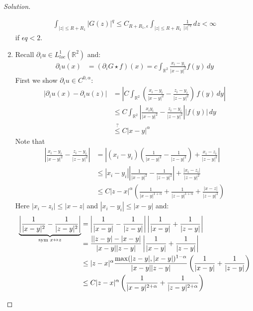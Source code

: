 \documentclass{report}
\theoremstyle{tommy}
\begin{document}
\begin{proof}[Solution]
\begin{enumerate}
      \begin{align*}
        \int_{|z| \le R + R_1} |G(z)|^q \le C_{R + R_1, \epsilon} \int_{|z| \le R + R_1} \frac{1}{|z|^{\epsilon q}} \, dz < \infty
      \end{align*}
      if \(\epsilon q < 2\).
      \item Recall \(\partial_i u \in L_{loc}^1(\mathbb{R}^2)\) and:
      \begin{align*}
        \partial_i u(x) &= (\partial_i G \star f)(x) 
        = c \int_{\mathbb{R}^2} \frac{x_i - y_i}{|x-y|^2} f(y) \, dy
      \end{align*}
      First we show \(\partial_i u \in C^{0, \alpha}\): 
      \begin{align*}
        |\partial_i u(x) - \partial_i u(z)|
        &= \left| C \int_{\mathbb{R}^2} \left(\frac{x_i - y_i}{|x-y|^2} - \frac{z_i - y_i}{|z-y|^2}\right) \, f(y) \, dy \right| \\
        &\le C \int_{\mathbb{R}^2} \left| \frac{x_i y_i}{|x-y|^2} - \frac{z_i - y_i}{|z-y|^2} \right| |f(y)| \, dy \\
        &\overset{?}{\le} C |x-y|^\alpha
      \end{align*}
      Note that 
      \begin{align*}
        \left| \frac{x_i - y_i}{|x-y|^2} - \frac{z_i - y_i}{|z-y|^2} \right| 
        &= \left| (x_i  - y_i) \left(\frac{1}{|x-y|^2} - \frac{1}{|z-y|^2}\right) + \frac{x_i - z_i}{|z-y|^2} \right| \\
        &\le |x_i - y_i| \left| \frac{1}{|x-y|^2} - \frac{1}{|z-y|^2} \right| + \frac{|x_i - z_i|}{|z-y|^2} \\
        &\le C|z-x|^\alpha \left(\frac{1}{|x-y|^{1 + \alpha}} + \frac{1}{|z-y|^{1 + \alpha}} + \frac{|x-z|}{|z-y|^{2}}\right)
      \end{align*}
      Here \(|x_i - z_i| \le |x-z|\) and \(|x_i - y_i| \le |x-y|\) and:
      \begin{align*}
        \smash{\underbrace{\left| \frac{1}{|x-y|^2} - \frac{1}{|z-y|^2} \right|}_{\text{sym } x \leftrightarrow z}}
        &= \left| \frac{1}{|x-y|} - \frac{1}{|z-y|}\right| \left| \frac{1}{|x-y|} + \frac{1}{|z-y|}\right| \\
        &= \frac{||z-y| - |x-y|}{|x-y||z-y|} \left| \frac{1}{|x-y|} + \frac{1}{|z-y|} \right| \\
        &\le |z-x|^\alpha \frac{\max(|z-y|, |x-y|)^{1-\alpha}}{|x-y| |z-y|} \left(\frac{1}{|x-y|} + \frac{1}{|z-y|}\right) \\
        &\le C |z-x|^\alpha \left(\frac{1}{|x-y|^{2 + \alpha}} + \frac{1}{|z-y|^{2 + \alpha}}\right)

\end{align*}
\end{enumerate}
\end{proof}
\end{document}
